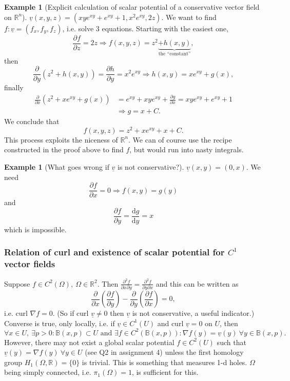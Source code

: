 \documentclass[a4paper]{article}
\theoremstyle{definition}
\newcommand{\curl}{\text{curl }}
\newtheorem{eg}[defn]{Example}
\begin{document}
\begin{eg}[Explicit calculation of scalar potential of a conservative vector field on $\mathbb R^n$]
$\underline v (x,y,z) = \left(xye^{xy}+e^{xy}+1,x^2 e^{xy},2z\right)$. We want to find $f:\underline v = (f_x,f_y,f_z)$, i.e. solve 3 equations. Starting with the easiest one,
\[
\frac{\partial f}{\partial z} = 2z \Rightarrow f(x,y,z)=z^2\underbrace{+h(x,y)}_{\text{the ``constant''}},
\]
then
\[
\frac{\partial}{\partial y} \left(z^2+h(x,y) \right) = \frac{\partial h}{\partial y} = x^2 e^{xy} \Rightarrow h(x,y) = xe^{xy}+g(x),
\]
finally
\[
\begin{aligned}
\frac{\partial}{\partial x} \left(z^2+xe^{xy}+g(x) \right) &= e^{xy}+xye^{xy} + \frac{\partial g}{\partial x} = xye^{xy}+e^{xy}+1 \\ &\Rightarrow g=x+C.
\end{aligned}
\]
We conclude that
\[
f(x,y,z) = z^2+xe^{xy}+x+C.
\]
This process exploits the niceness of $\mathbb R^n$. We can of course use the recipe constructed in the proof above to find $f$, but would run into nasty integrals.
\end{eg}
\begin{eg}[What goes wrong if $\underline v$ is not conservative?]
$\underline v(x,y)=(0,x)$. We need
\[
\frac{\partial f}{\partial x} = 0 \Rightarrow f(x,y)=g(y)
\]
and
\[
\frac{\partial f}{\partial y} = \frac{\mathrm d g}{\mathrm d y} =x
\]
which is impossible.
\end{eg}
\subsubsection{Relation of curl and existence of scalar potential for $C^1$ vector fields}
Suppose $f\in C^2(\Omega),\ \Omega \in \mathbb R^2$. Then $\frac{\partial^2 f}{\partial x \partial y}=\frac{\partial^2 f}{\partial y \partial x}$ and this can be written as
\[
\frac{\partial}{\partial x} \left( \frac{\partial f}{\partial y} \right) - \frac{\partial}{\partial y} \left( \frac{\partial f}{\partial x} \right) =0,
\]
i.e. $\curl \nabla f = 0$. (So if $\curl \underline v \neq 0$ then $\underline v$ is not conservative, a useful indicator.) Converse is true, only locally, i.e. if $\underline v \in C^1(U)$ and $\curl \underline v= 0$ on $U$, then
\[
\forall x\in U,\ \exists p>0: \mathbb B(x,p) \subset U \text{ and } \exists f \in C^2 (\mathbb B(x,p)) : \nabla f(y)=\underline v (y) \ \forall y \in \mathbb B(x,p).
\]
However, there may not exist a global scalar potential $f\in C^2(U)$ such that $\underline v(y) = \nabla f(y) \ \forall y\in U$ (see Q2 in assignment 4) unless the first homology group $H_1(\Omega,\mathbb R)=\{0\}$ is trivial. This is something that measures 1-d holes. $\Omega$ being simply connected, i.e. $\pi_1(\Omega)=1$, is sufficient for this.
\end{document}
